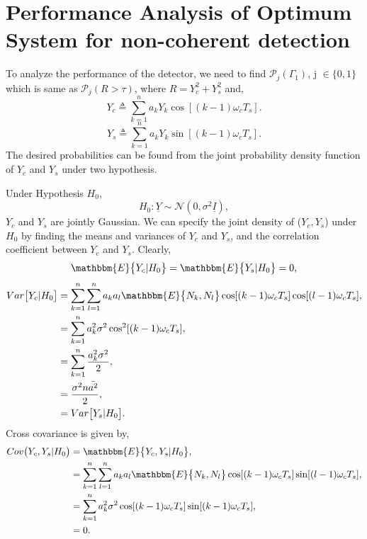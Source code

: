 \documentclass[a4paper,english,12pt]{article}
\begin{document}
\section{Performance Analysis of Optimum System for non-coherent detection}
To analyze the performance of the detector, we need to find  $\mathcal{P}_j(\Gamma_1)$, j $\in \{0,1\}$ which is same as $\mathcal{P}_j(R>\tau)$, where $R=Y_c^2+Y_s^2$ and,
\begin{equation*}
Y_c\triangleq\sum_{k=1}^{n}a_k Y_k\cos[(k-1)\omega_c T_s].
\end{equation*}
\begin{equation*}
Y_s\triangleq\sum_{k=1}^{n}a_k Y_k\sin[(k-1)\omega_c T_s].
\end{equation*}
The desired probabilities can be found from the joint probability density function of $Y_c$ and $Y_s$ under two hypothesis. 
\par Under Hypothesis $H_0$,
\begin{equation*}
H_0: \underline{Y} \sim \mathcal{N}(0,\sigma^2\underline{I}),
\end{equation*}
$Y_c$ and $Y_s$ are jointly Gaussian. We can specify the joint density of ($Y_c,Y_s$) under $H_0$ by finding the means and variances of $Y_c$ and $Y_s$, and the correlation coefficient between $Y_c$ and $Y_s$. Clearly,
\begin{equation*}
\mathbbm{E}\big\{Y_c|H_0\big\} = \mathbbm{E}\big\{Y_s|H_0\big\} = 0,
\end{equation*}
\begin{equation*}
\begin{aligned}
Var\big[Y_c|H_0\big]
&=\sum_{k=1}^{n}\sum_{l=1}^{n}a_k a_l\mathbbm{E}\big\{N_k,N_l\big\}\cos[(k-1)\omega_c T_s]\cos[(l-1)\omega_c T_s], \\
&= \sum_{k=1}^{n}a_k^2\sigma^2\cos^2[(k-1)\omega_c T_s], \\
&= \sum_{k=1}^{n}\frac{a_k^2\sigma^2}{2}, \\
&= \frac{\sigma^2n\bar{a^2}}{2},\\
&= Var\big[Y_s|H_0\big].
\end{aligned}
\end{equation*}
Cross covariance is given by,
\begin{equation*}
\begin{aligned}
Cov\big(Y_c,Y_s|H_0\big) &=\mathbbm{E}\big\{Y_c,Y_s|H_0\big\},\\
&=\sum_{k=1}^{n}\sum_{l=1}^{n}a_k a_l\mathbbm{E}\big\{N_k,N_l\big\}\cos[(k-1)\omega_c T_s]\sin[(l-1)\omega_c T_s], \\
&=\sum_{k=1}^{n}a_k^2\sigma^2\cos[(k-1)\omega_c T_s]\sin[(k-1)\omega_c T_s], \\
&= 0.
\end{aligned}
\end{equation*}
\end{document}
